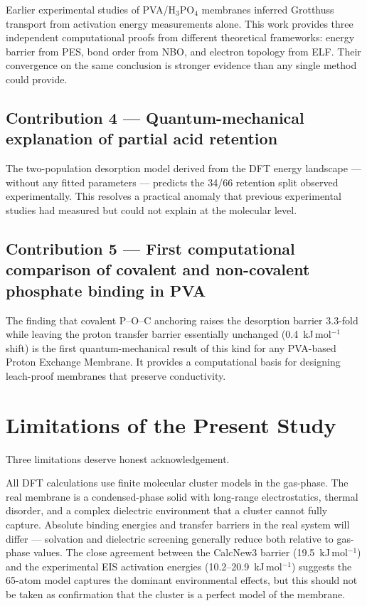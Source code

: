 \documentclass[12pt,a4paper]{report}
\begin{document}
Earlier experimental studies of PVA/H\(_3\)PO\(_4\) 
membranes inferred Grotthuss transport from activation 
energy measurements alone. This work provides three 
independent computational proofs from different 
theoretical frameworks: energy barrier from PES, bond 
order from NBO, and electron topology from ELF. Their 
convergence on the same conclusion is stronger evidence 
than any single method could provide.

\subsection*{Contribution 4 --- Quantum-mechanical 
explanation of partial acid retention}

The two-population desorption model derived from the DFT 
energy landscape — without any fitted parameters — 
predicts the 34/66 retention split observed experimentally. 
This resolves a practical anomaly that previous experimental 
studies had measured but could not explain at the molecular 
level.

\subsection*{Contribution 5 --- First computational 
comparison of covalent and non-covalent phosphate 
binding in PVA}

The finding that covalent P--O--C anchoring raises the 
desorption barrier 3.3-fold while leaving the proton 
transfer barrier essentially unchanged (0.4~kJ\,mol\(^{-1}\) 
shift) is the first quantum-mechanical result of this kind 
for any PVA-based Proton Exchange Membrane. It provides a 
computational basis for designing leach-proof membranes 
that preserve conductivity.

\section{Limitations of the Present Study}

Three limitations deserve honest acknowledgement.

All DFT calculations use finite molecular cluster models 
in the gas-phase. The real membrane is a condensed-phase 
solid with long-range electrostatics, thermal disorder, and 
a complex dielectric environment that a cluster cannot 
fully capture. Absolute binding energies and transfer 
barriers in the real system will differ — solvation and 
dielectric screening generally reduce both relative to 
gas-phase values. The close agreement between the 
CalcNew3 barrier (19.5~kJ\,mol\(^{-1}\)) and the 
experimental EIS activation energies (10.2--20.9~kJ\,mol\(^{-1}\)) 
suggests the 65-atom model captures the dominant 
environmental effects, but this should not be taken as 
confirmation that the cluster is a perfect model of the 
membrane.
\end{document}
